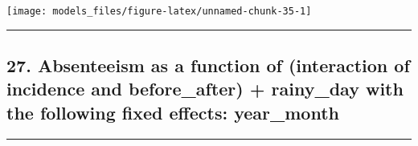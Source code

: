 \documentclass[]{article}
\begin{document}
\begin{center}\texttt{[image: models\_files/figure-latex/unnamed-chunk-35-1]} \end{center}

\newpage

\begin{center}\rule{0.5\linewidth}{\linethickness}\end{center}

\subsection{27. Absenteeism as a function of (interaction of incidence
and before\_after) + rainy\_day with the following fixed effects:
year\_month}\label{absenteeism-as-a-function-of-interaction-of-incidence-and-before_after-rainy_day-with-the-following-fixed-effects-year_month}

\begin{center}\rule{0.5\linewidth}{\linethickness}\end{center}
\end{document}
